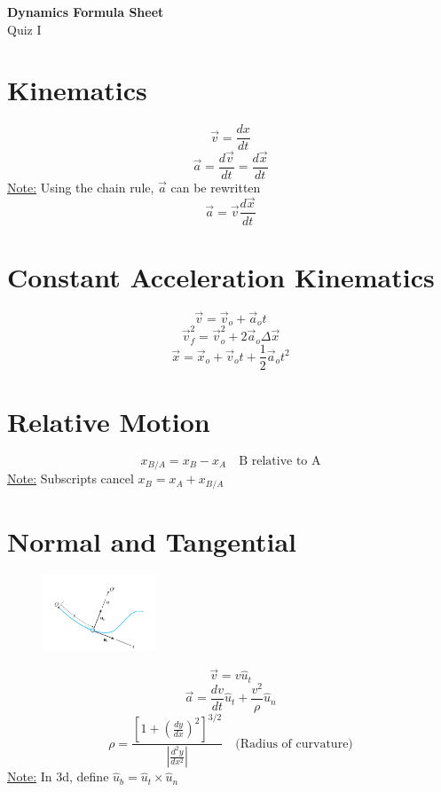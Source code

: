 \documentclass[10pt, fleqn]{article}
\begin{document}
\begin{center}
    \Large \textbf{Dynamics Formula Sheet} \\
    \normalsize Quiz I
\end{center}

\begin{multicols}{2}

\section*{Kinematics}
\[\vec{v}=\frac{dx}{dt}\]
\[\vec{a}=\frac{d\vec{v}}{dt}=\frac{d\vec{x}}{dt}\]
\underline{Note:} Using the chain rule, $\vec{a}$ can be rewritten
\[\vec{a}=\vec{v}\frac{d\vec{x}}{dt}\]
\section*{Constant Acceleration Kinematics}
\[\vec{v}=\vec{v}_o+\vec{a}_ot\]
\[\vec{v}_f^2=\vec{v}_o^2+2\vec{a}_o\Delta \vec{x}\]
\[\vec{x}=\vec{x}_o+\vec{v}_ot+\frac{1}{2}\vec{a}_ot^2\]
\section*{Relative Motion}
\[x_{B/A}=x_B-x_A \quad \text{B relative to A}\]
\underline{Note:} Subscripts cancel $x_B=x_A+x_{B/A}$
\section*{Normal and Tangential}
\begin{figure}[H]
    \includegraphics[width=0.3\textwidth]{normal and tangential.png}
\end{figure}
\[\vec{v}=v\hat{u}_t\]
\[\vec{a}=\frac{dv}{dt}\hat{u}_t+\frac{v^2}{\rho}\hat{u}_n\]
\[\rho = \frac{\left[1+\left(\frac{dy}{dx}\right)^2 \right]^{3/2}}{\left|\frac{d^2y}{dx^2} \right|} \quad \text{(Radius of curvature)}\]
\underline{Note:} In 3d, define $\hat{u}_b=\hat{u}_t \times \hat{u}_n$ 
\columnbreak

\end{multicols}
\end{document}

